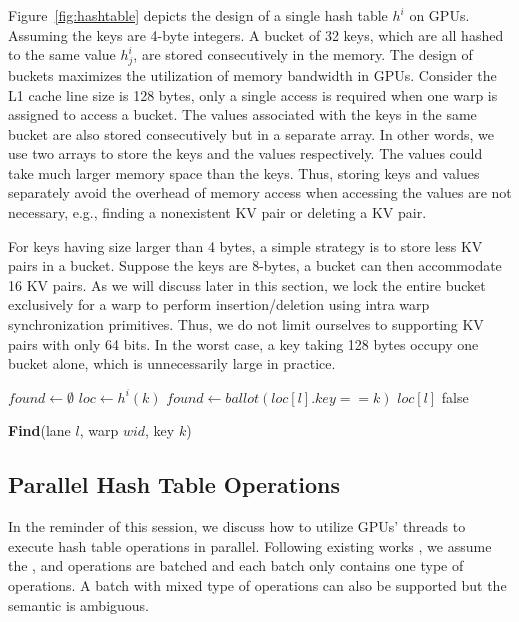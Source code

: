 Figure~\ref{fig:hashtable} depicts the design of a single hash table $h^i$ on GPUs. 
Assuming the keys are 4-byte integers. A bucket of 32 keys, which are all hashed to the same value $h^i_j$, are stored consecutively in the memory. 
The design of buckets maximizes the utilization of memory bandwidth in GPUs. 
Consider the L1 cache line size is 128 bytes, only a single access is required when one warp is assigned to access a bucket. 
The values associated with the keys in the same bucket are also stored consecutively but in a separate array.   
In other words, we use two arrays to store the keys and the values respectively.
The values could take much larger memory space than the keys. 
Thus, storing keys and values separately avoid the overhead of memory access when accessing the values are not necessary, 
e.g., finding a nonexistent KV pair or deleting a KV pair. 

For keys having size larger than 4 bytes, a simple strategy is to store less KV pairs in a bucket. Suppose the keys are 8-bytes, a bucket can then accommodate 16 KV pairs. 
As we will discuss later in this section, we lock the entire bucket exclusively for a warp to perform insertion/deletion using intra warp synchronization primitives. Thus, we do not limit ourselves to supporting KV pairs with only 64 bits. 
In the worst case, a key taking 128 bytes occupy one bucket alone, which is unnecessarily large in practice.


\begin{algorithm}[t]
	\begin{algorithmic}[1]
		\State $found \gets \emptyset$
		\State $loc \gets h^i(k)$
		\State $found \gets ballot(loc[l].key == k)$
		\State \Return $loc[l]$
		\EndIf
		\EndFor
		\State \Return false
	\end{algorithmic}
	\caption{\textbf{Find}(lane $l$, warp $wid$, key $k$)}\label{algo:find}
\end{algorithm}

\subsection{Parallel Hash Table Operations}\label{sec:vot:con}
In the reminder of this session, we discuss how to utilize GPUs' threads to execute hash table operations in parallel.
Following existing works \cite{alcantara2009real,zhang2015mega,breslow2016horton}, we assume the ,  and  operations are batched and each batch only contains one type of operations. A batch with mixed type of operations can also be supported but the semantic is ambiguous. 



